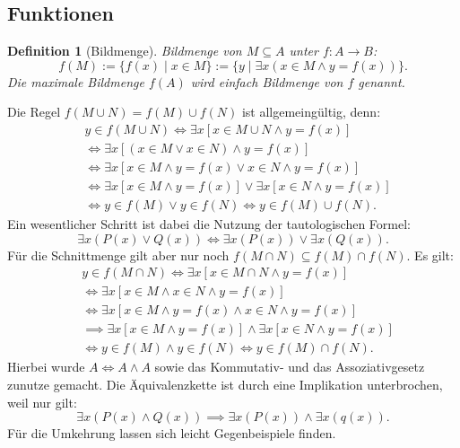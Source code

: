 \documentclass[a4paper,11pt,fleqn,twoside]{scrartcl}
\numberwithin{equation}{section}
\theoremstyle{rmbox}
\newtheorem{Definition}{Definition}
\newcommand{\emdef}[1]{\emph{#1}}
\begin{document}
\subsection{Funktionen}
\begin{Definition}[Bildmenge]
\emph{Bildmenge} von $M\subseteq A$ unter $f\colon A\to B$:
\begin{equation}
f(M) := \{f(x)\mid x\in M\} := \{y\mid \exists x(x\in M\land y=f(x))\}.
\end{equation}
Die maximale Bildmenge $f(A)$ wird einfach \emdef{Bildmenge} von $f$ genannt.
\end{Definition}
Die Regel $f(M\cup N)=f(M)\cup f(N)$ ist allgemeingültig, denn:
\begin{align}
&y\in f(M\cup N) \iff \exists x[x\in M\cup N\land y=f(x)]\\
&\iff \exists x[(x\in M\lor x\in N)\land y=f(x)]\\
&\iff \exists x[x\in M\land y=f(x)\lor x\in N\land y=f(x)]\\
&\iff \exists x[x\in M\land y=f(x)]\lor\exists x[x\in N\land y=f(x)]\\
&\iff y\in f(M) \lor y\in f(N)
\iff y\in f(M)\cup f(N).
\end{align}
Ein wesentlicher Schritt ist dabei die Nutzung der tautologischen
Formel:
\begin{equation}
\exists x(P(x)\lor Q(x)) \iff \exists x(P(x))\lor\exists x(Q(x)).
\end{equation}
Für die Schnittmenge gilt aber nur noch
$f(M\cap N)\subseteq f(M)\cap f(N)$. Es gilt:
\begin{align}
& y\in f(M\cap N) \iff \exists x[x\in M\cap N\land y=f(x)]\\
& \iff \exists x[x\in M\land x\in N\land y=f(x)]\\
& \iff \exists x[x\in M\land y=f(x)\land x\in N\land y=f(x)]\\
& \implies \exists x[x\in M\land y=f(x)]\land\exists x[x\in N\land y=f(x)]\\
& \iff y\in f(M)\land y\in f(N)
\iff y\in f(M)\cap f(N).
\end{align}
Hierbei wurde $A\Leftrightarrow A\land A$ sowie das Kommutativ- und das
Assoziativgesetz zunutze gemacht. Die Äquivalenzkette ist durch
eine Implikation unterbrochen, weil nur gilt:
\begin{equation}
\exists x(P(x)\land Q(x)) \implies \exists x(P(x))\land\exists x(q(x)).
\end{equation}
Für die Umkehrung lassen sich leicht Gegenbeispiele finden.
\end{document}
